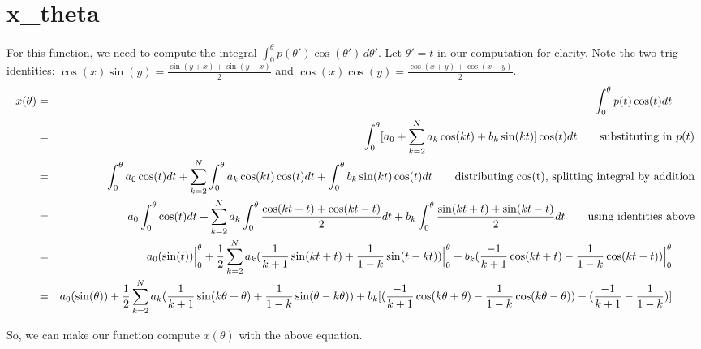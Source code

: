 \documentclass{article}
\begin{document}
\section*{x\_theta}
For this function, we need to compute the integral $\int_{0}^{\theta} p(\theta')\cos(\theta') \,d\theta'$. Let $\theta' = t$ in our computation for clarity. Note the two trig identities: $\cos(x)\sin(y)=\frac{\sin(y+x)+\sin(y-x)}{2}$ and $\cos(x)\cos(y)=\frac{\cos(x+y)+\cos(x-y)}{2}$.
\begin{eqnarray*}
     x(\theta)
      & = & \int_0^\theta p(t)\cos(t)dt
            ~~~~~~ \mbox{\rm } \\
      & = & \int_0^\theta [a_0 +\sum_{k=2}^{N} a_k\cos(kt)+b_k\sin(kt)]\cos(t)dt
            ~~~~~~ \mbox{\rm substituting in $p(t)$} \\
      & = & \int_0^\theta a_0\cos(t)dt +\sum_{k=2}^{N} \int_0^\theta a_k\cos(kt)\cos(t)dt+ \int_0^\theta b_k\sin(kt)\cos(t)dt
            ~~~~~~ \mbox{\rm distributing cos(t), splitting integral by addition} \\
      & = & a_0\int_0^\theta \cos(t)dt +\sum_{k=2}^{N} a_k\int_0^\theta \frac{\cos(kt+t)+\cos(kt-t)}{2}dt+ b_k\int_0^\theta \frac{\sin(kt+t)+\sin(kt-t)}{2} dt
            ~~~~~~ \mbox{\rm using identities above} \\
      & = & a_0 (\sin(t))\Big|_0^\theta +\frac{1}{2}\sum_{k=2}^{N} a_k(\frac{1}{k+1}\sin(kt+t)+\frac{1}{1-k}\sin(t-kt))\Big|_0^\theta+ b_k(\frac{-1}{k+1}\cos(kt+t)-\frac{1}{1-k}\cos(kt-t))\Big|_0^\theta
            ~~~~~~ \mbox{\rm } \\
      & = & a_0 (\sin(\theta)) +\frac{1}{2}\sum_{k=2}^{N} a_k(\frac{1}{k+1}\sin(k\theta+\theta)+\frac{1}{1-k}\sin(\theta-k\theta))+ b_k[(\frac{-1}{k+1}\cos(k\theta+\theta)-\frac{1}{1-k}\cos(k\theta-\theta))-(\frac{-1}{k+1}-\frac{1}{1-k})]
            ~~~~~~ \mbox{\rm } \\
\end{eqnarray*}

So, we can make our function compute $x(\theta)$ with the above equation. 
\end{document}
